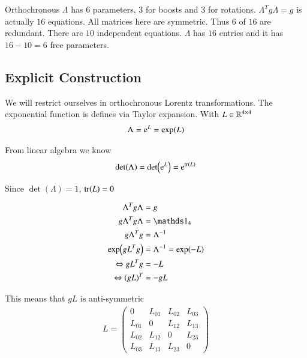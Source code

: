 Orthochronous $\Lambda$ has 6 parameters, $3$ for boosts and $3$ for rotations. $\Lambda^T g \Lambda = g$ is actually $16$ equations. All matrices here are symmetric. Thus $6$ of $16$ are redundant. There are $10$ independent equations.
$\Lambda$ has $16$ entries and it has $16-10=6$ free parameters.

\subsection{Explicit Construction}
We will restrict ourselves in orthochronous Lorentz transformations. The exponential function is defines via Taylor expansion. With $L \in \mathbb{R}^{4 \times 4}$
\begin{align*}
   \Lambda = \mathrm{e}^L = \exp(L)
\end{align*}

From linear algebra we know
\begin{align}
   \det(\Lambda) = \det(\mathrm{e}^L) = \mathrm{e}^{\tr(L)}
\end{align}

Since $\det(\Lambda) = 1$, $\tr(L) = 0$

\begin{align*}
   \Lambda^T g \Lambda &= g \\
   g \Lambda^T g \Lambda &= \id_4 \\
   g \Lambda^T g &= \Lambda^{-1} \\
   \exp(g L^T g) &= \Lambda^{-1} = \exp(-L) \\
   \Leftrightarrow g L^T g &= -L \\
   \Leftrightarrow (gL)^T &= - gL
\end{align*}

This means that $gL$ is anti-symmetric
\begin{align*}
   L = \begin{pmatrix} 0 & L_{01} & L_{02} & L_{03} \\ L_{01} & 0 & L_{12} & L_{13} \\ L_{02} & L_{12} & 0 & L_{23} \\ L_{03} & L_{13} & L_{23} & 0\end{pmatrix}
\end{align*}

